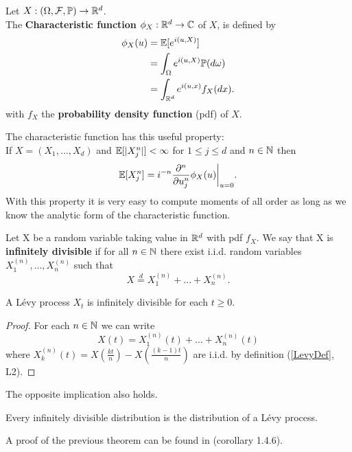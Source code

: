 \begin{Definition} \label{chf}
Let $X:(\Omega,\mathcal{F}, \mathbb{P}) \to \mathbb{R}^d$.\\ 
The \textbf{Characteristic function} $\phi_X:\mathbb{R}^d \to \mathbb{C}$  of $X$, is defined by
\begin{align}
\phi_{X}(u) &= \mathbb{E} [e^{i(u,X)}] \nonumber \\
            &= \int_{\Omega} e^{i(u,X)} \mathbb{P}(d\omega) \nonumber \\
            &= \int_{\mathbb{R}^d} e^{i(u,x)} f_X(dx).
\end{align}
with $f_X$ the \textbf{probability density function} (pdf) of $X$.
\end{Definition}
The characteristic function has this useful property:\\
If $X=(X_1,...,X_d)$ and $\mathbb{E}[|X_{j}^{n}|] < \infty$ for $1\leq j \leq d$ and $n \in \mathbb{N}$ then
\begin{equation}\label{moments}
 \mathbb{E}[X_{j}^{n}] = i^{-n}\frac{\partial^n}{\partial u_{j}^{n}} \phi_X(u) \biggr|_{u=0} .
\end{equation}
With this property it is very easy to compute moments of all order as long as we know the analytic form 
of the characteristic function.

\begin{Definition}\label{inf_div}
 Let X be a random variable taking value in $\mathbb{R}^d$ with pdf $f_X$.
 We say that X is \textbf{infinitely divisible} if for all $n \in \mathbb{N}$ there exist i.i.d. random variables $X_1^{(n)},...,X_n^{(n)}$
 such that
 \begin{equation}
  X \overset{d}{=} X_1^{(n)} + ... + X_n^{(n)}.
 \end{equation}
\end{Definition}

\begin{Theorem}
 A Lévy process $X_t$ is infinitely divisible for each $t\geq0$. 
\end{Theorem}
\begin{proof}
 For each $n \in \mathbb{N}$ we can write 
 $$ X(t) = X_1^{(n)}(t) + ... + X_n^{(n)}(t) $$
 where $ X_k^{(n)}(t) = X(\frac{kt}{n}) - X(\frac{(k-1)t}{n}) $ are i.i.d. by definition (\ref{LevyDef}, L2).
\end{proof}

The opposite implication also holds. 
\begin{Theorem}
Every infinitely divisible distribution is the distribution of a Lévy process. 
\end{Theorem}
A proof of the previous theorem can be found in \cite{Applebaum} (corollary 1.4.6).

